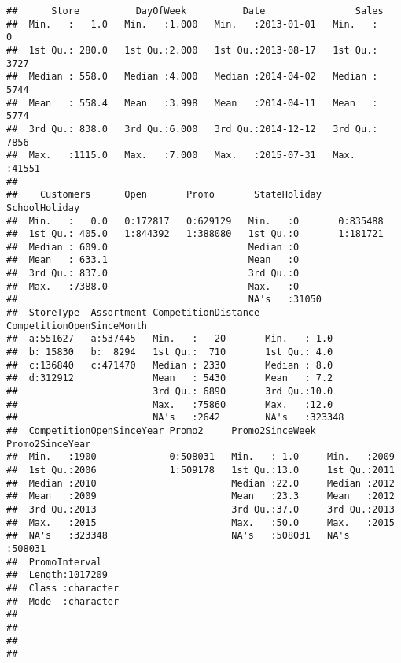 \documentclass[]{article}
\begin{document}
\begin{verbatim}
##      Store          DayOfWeek          Date                Sales      
##  Min.   :   1.0   Min.   :1.000   Min.   :2013-01-01   Min.   :    0  
##  1st Qu.: 280.0   1st Qu.:2.000   1st Qu.:2013-08-17   1st Qu.: 3727  
##  Median : 558.0   Median :4.000   Median :2014-04-02   Median : 5744  
##  Mean   : 558.4   Mean   :3.998   Mean   :2014-04-11   Mean   : 5774  
##  3rd Qu.: 838.0   3rd Qu.:6.000   3rd Qu.:2014-12-12   3rd Qu.: 7856  
##  Max.   :1115.0   Max.   :7.000   Max.   :2015-07-31   Max.   :41551  
##                                                                       
##    Customers      Open       Promo       StateHoliday   SchoolHoliday
##  Min.   :   0.0   0:172817   0:629129   Min.   :0       0:835488     
##  1st Qu.: 405.0   1:844392   1:388080   1st Qu.:0       1:181721     
##  Median : 609.0                         Median :0                    
##  Mean   : 633.1                         Mean   :0                    
##  3rd Qu.: 837.0                         3rd Qu.:0                    
##  Max.   :7388.0                         Max.   :0                    
##                                         NA's   :31050                
##  StoreType  Assortment CompetitionDistance CompetitionOpenSinceMonth
##  a:551627   a:537445   Min.   :   20       Min.   : 1.0             
##  b: 15830   b:  8294   1st Qu.:  710       1st Qu.: 4.0             
##  c:136840   c:471470   Median : 2330       Median : 8.0             
##  d:312912              Mean   : 5430       Mean   : 7.2             
##                        3rd Qu.: 6890       3rd Qu.:10.0             
##                        Max.   :75860       Max.   :12.0             
##                        NA's   :2642        NA's   :323348           
##  CompetitionOpenSinceYear Promo2     Promo2SinceWeek  Promo2SinceYear 
##  Min.   :1900             0:508031   Min.   : 1.0     Min.   :2009    
##  1st Qu.:2006             1:509178   1st Qu.:13.0     1st Qu.:2011    
##  Median :2010                        Median :22.0     Median :2012    
##  Mean   :2009                        Mean   :23.3     Mean   :2012    
##  3rd Qu.:2013                        3rd Qu.:37.0     3rd Qu.:2013    
##  Max.   :2015                        Max.   :50.0     Max.   :2015    
##  NA's   :323348                      NA's   :508031   NA's   :508031  
##  PromoInterval     
##  Length:1017209    
##  Class :character  
##  Mode  :character  
##                    
##                    
##                    
## 
\end{verbatim}
\end{document}
